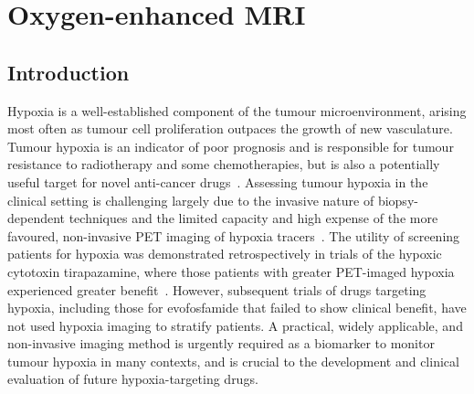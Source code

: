 
\chapter{Oxygen-enhanced MRI}
\label{ch:oemri1}

\section{Introduction}

Hypoxia is a well-established component of the tumour microenvironment, arising most often as tumour cell proliferation outpaces the growth of new vasculature.
Tumour hypoxia is an indicator of poor prognosis and is responsible for tumour resistance to radiotherapy and some chemotherapies, but is also a potentially useful target for novel anti-cancer drugs~\cite{Wilson:2011jp}.
Assessing tumour hypoxia in the clinical setting is challenging largely due to the invasive nature of biopsy-dependent techniques and the limited capacity and high expense of the more favoured, non-invasive PET imaging of hypoxia tracers~\cite{Horsman:2012kw}.
The utility of screening patients for hypoxia was demonstrated retrospectively in trials of the hypoxic cytotoxin tirapazamine, where those patients with greater PET-imaged hypoxia experienced greater benefit~\cite{Rischin:2006fz}.
However, subsequent trials of drugs targeting hypoxia, including those for evofosfamide that failed to show clinical benefit, have not used hypoxia imaging to stratify patients.
A practical, widely applicable, and non-invasive imaging method is urgently required as a biomarker to monitor tumour hypoxia in many contexts, and is crucial to the development and clinical evaluation of future hypoxia-targeting drugs.

